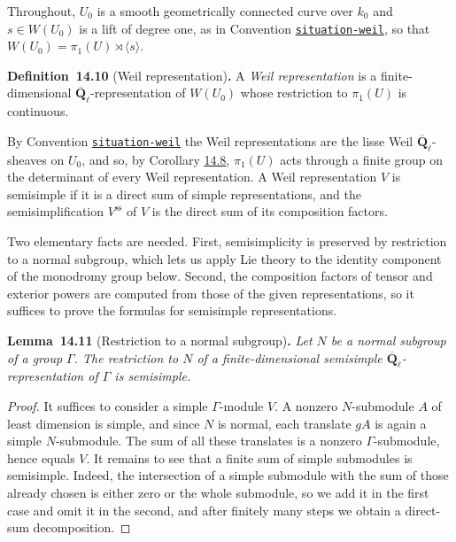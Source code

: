 \documentclass[11pt]{article}
\newenvironment{bpstatement}[2]{\par\addvspace{0.6\baselineskip}\noindent\textbf{#1}#2\textbf{.}\enspace\ignorespaces}
  {\par\addvspace{0.4\baselineskip}}
\newenvironment{bpstatementit}[2]{\begin{bpstatement}{#1}{#2}\itshape\ignorespaces}{\end{bpstatement}}
\newcommand{\bpslug}[1]{\texttt{#1}}
\begin{document}
Throughout, \(U_0\) is a smooth geometrically connected curve over \(k_0\) and \(s\in W(U_0)\) is a lift of degree one, as in Convention \hyperref[bp7]{\bpslug{situation-{}\allowbreak{}weil}}, so that \(W(U_0)=\pi_1(U)\rtimes\langle s\rangle\).

\label{bp73}%
\begin{bpstatement}{Definition~14.10}{ (Weil representation)}
A \emph{Weil representation} is a finite-dimensional \(\overline{\mathbf Q}_\ell\)-representation of \(W(U_0)\) whose restriction to \(\pi_1(U)\) is continuous.
\end{bpstatement}

\label{bp74}%
By Convention \hyperref[bp7]{\bpslug{situation-{}\allowbreak{}weil}} the Weil representations are the lisse Weil \(\overline{\mathbf Q}_\ell\)-sheaves on \(U_0\), and so, by Corollary \hyperref[bp65]{14.8}, \(\pi_1(U)\) acts through a finite group on the determinant of every Weil representation. A Weil representation \(V\) is semisimple if it is a direct sum of simple representations, and the semisimplification \(V^{\mathrm{ss}}\) of \(V\) is the direct sum of its composition factors.

Two elementary facts are needed. First, semisimplicity is preserved by restriction to a normal subgroup, which lets us apply Lie theory to the identity component of the monodromy group below. Second, the composition factors of tensor and exterior powers are computed from those of the given representations, so it suffices to prove the formulas for semisimple representations.

\label{bp75}%
\begin{bpstatementit}{Lemma~14.11}{ (Restriction to a normal subgroup)}
Let \(N\) be a normal subgroup of a group \(\Gamma\). The restriction to \(N\) of a finite-dimensional semisimple \(\overline{\mathbf Q}_\ell\)-representation of \(\Gamma\) is semisimple.
\end{bpstatementit}

\begin{proof}[{Proof}]\label{bp76}%
It suffices to consider a simple \(\Gamma\)-module \(V\). A nonzero \(N\)-submodule \(A\) of least dimension is simple, and since \(N\) is normal, each translate \(gA\) is again a simple \(N\)-submodule. The sum of all these translates is a nonzero \(\Gamma\)-submodule, hence equals \(V\). It remains to see that a finite sum of simple submodules is semisimple. Indeed, the intersection of a simple submodule with the sum of those already chosen is either zero or the whole submodule, so we add it in the first case and omit it in the second, and after finitely many steps we obtain a direct-sum decomposition.
\end{proof}
\end{document}
